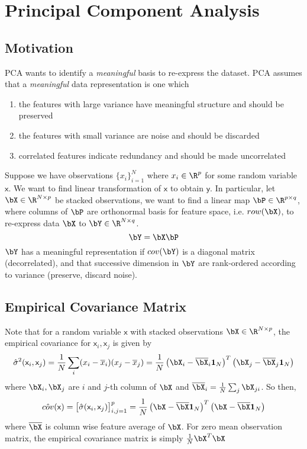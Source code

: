 \documentclass[11pt]{article}
\newcommand\ry{\ensuremath{\mathsf{y}}}
\newcommand\rx{\ensuremath{\mathsf{x}}}
\begin{document}
\section{Principal Component Analysis}

\subsection{Motivation}

PCA wants to identify a \textit{meaningful} basis to re-express the dataset. PCA assumes that a \textit{meaningful} data representation is one which
\begin{enumerate}
    \item the features with large variance have meaningful structure and should be preserved
    \item the features with small variance are noise and should be discarded
    \item correlated features indicate redundancy and should be made uncorrelated
\end{enumerate}
Suppose we have observations $\{x_i\}_{i=1}^N$ where $x_i\in \R^p$ for some random variable $\rx$. We want to find linear transformation of $\rx$ to obtain $\ry$. In particular, let $\bX \in \R^{N\times p}$ be stacked observations, we want to find a linear map $\bP \in \R^{p\times q}$, where columns of $\bP$ are orthonormal basis for feature space, i.e. $row(\bX)$, to re-express data $\bX$ to $\bY \in \R^{N\times q}$.
\[
    \bY = \bX \bP    
\]
$\bY$ has a meaningful representation if $cov(\bY)$ is a diagonal matrix (decorrelated), and that successive dimension in $\bY$ are rank-ordered according to variance (preserve, discard noise). 

\subsection{Empirical Covariance Matrix}

Note that for a random variable $\rx$ with stacked observations $\bX\in\R^{N\times p}$, the empirical covariance for $\rx_i,\rx_j$ is given by 
\[
    \hat{\sigma}^2(\rx_i,\rx_j)
    = \frac{1}{N} \sum_i (x_i-\overline{x}_i)(x_j-\overline{x}_j) 
    = \frac{1}{N} \left( \bX_i - \overline{\bX}_i \mathbf{1}_N \right)^T \left( \bX_j - \overline{\bX}_j \mathbf{1}_N \right)
\]
where $\bX_i,\bX_j$ are $i$ and $j$-th column of $\bX$ and $\overline{\bX}_i = \frac{1}{N} \sum_j \bX_{ji}$. So then,
\[
    \hat{cov}(\rx) 
    = \begin{bmatrix}
        \hat{\sigma}(\rx_i,\rx_j)
    \end{bmatrix}_{i,j=1}^p
    = \frac{1}{N} \left( \bX - \overline{\bX} \mathbf{1}_N \right)^T \left( \bX - \overline{\bX} \mathbf{1}_N \right)
\]
where $\overline{\bX}$ is column wise feature average of $\bX$. For zero mean observation matrix, the empirical covariance matrix is simply $\frac{1}{N} \bX^T \bX$
\end{document}
